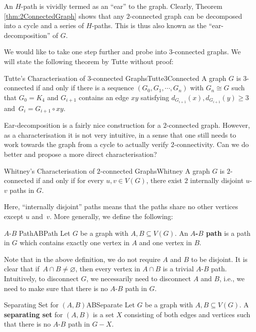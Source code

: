 \documentclass[math]{amznotes}
\theoremstyle{remark}
\newcommand{\0}{\mathbf{0}}
\newcommand{\1}{\mathbf{1}}
\begin{document}
An $H$-path is vividly termed as an ``ear'' to the graph. Clearly, Theorem \ref{thm:2ConnectedGraph} shows that any $2$-connected graph can be decomposed into a cycle and a series of $H$-paths. This is thus also known as the ``ear-decomposition'' of $G$.

We would like to take one step further and probe into $3$-connected graphs. We will state the following theorem by Tutte without proof:
\begin{thmbox}{Tutte's Characterisation of $3$-connected Graphs}{Tutte3Connected}
    A graph $G$ is $3$-connected if and only if there is a sequence $\left(G_0, G_1, \cdots, G_n\right)$ with $G_n \cong G$ such that $G_0 = K_4$ and $G_{i + 1}$ contains an edge $xy$ satisfying $d_{G_{i + 1}}(x), d_{G_{i + 1}}(y) \geq 3$ and~$G_i = G_{i + 1} \circ xy$. 
\end{thmbox}
Ear-decomposition is a fairly nice construction for a $2$-connected graph. However, as a characterisation it is not very intuitive, in a sense that one still needs to work towards the graph from a cycle to actually verify $2$-connectivity. Can we do better and propose a more direct characterisation?
\begin{thmbox}{Whitney's Characterisation of $2$-connected Graphs}{Whitney}
    A graph $G$ is $2$-connected if and only if for every $u, v \in V(G)$, there exist $2$ internally disjoint $u$-$v$ paths in $G$.
\end{thmbox}
Here, ``internally disjoint'' paths means that the paths share no other vertices except $u$ and~$v$. More generally, we define the following:
\begin{dfnbox}{$A$-$B$ Path}{ABPath}
    Let $G$ be a graph with $A, B \subseteq V(G)$. An {\color{red} \textbf{$A$-$B$ path}} is a path in $G$ which contains exactly one vertex in $A$ and one vertex in $B$.
\end{dfnbox} 
Note that in the above definition, we do not require $A$ and $B$ to be disjoint. It is clear that if~$A \cap B \neq \varnothing$, then every vertex in $A \cap B$ is a trivial $A$-$B$ path. Intuitively, to disconnect $G$, we necessarily need to disconnect $A$ and $B$, i.e., we need to make sure that there is no $A$-$B$ path in $G$.
\begin{dfnbox}{Separating Set for $(A, B)$}{ABSeparate}
    Let $G$ be a graph with $A, B \subseteq V(G)$. A {\color{red} \textbf{separating set}} for $(A, B)$ is a set $X$ consisting of both edges and vertices such that there is no $A$-$B$ path in $G - X$.
\end{dfnbox}
\end{document}
